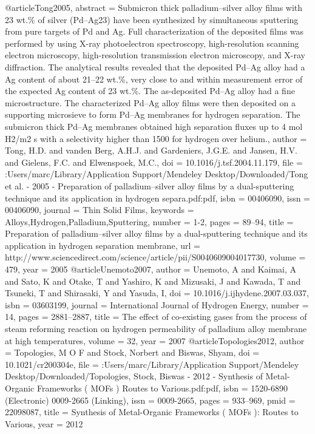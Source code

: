 @article{Tong2005,
abstract = {Submicron thick palladium–silver alloy films with 23 wt.{\%} of silver (Pd–Ag23) have been synthesized by simultaneous sputtering from pure targets of Pd and Ag. Full characterization of the deposited films was performed by using X-ray photoelectron spectroscopy, high-resolution scanning electron microscopy, high-resolution transmission electron microscopy, and X-ray diffraction. The analytical results revealed that the deposited Pd–Ag alloy had a Ag content of about 21–22 wt.{\%}, very close to and within measurement error of the expected Ag content of 23 wt.{\%}. The as-deposited Pd–Ag alloy had a fine microstructure. The characterized Pd–Ag alloy films were then deposited on a supporting microsieve to form Pd–Ag membranes for hydrogen separation. The submicron thick Pd–Ag membranes obtained high separation fluxes up to 4 mol H2/m2 s with a selectivity higher than 1500 for hydrogen over helium.},
author = {Tong, H.D. and vanden Berg, A.H.J. and Gardeniers, J.G.E. and Jansen, H.V. and Gielens, F.C. and Elwenspoek, M.C.},
doi = {10.1016/j.tsf.2004.11.179},
file = {:Users/marc/Library/Application Support/Mendeley Desktop/Downloaded/Tong et al. - 2005 - Preparation of palladium–silver alloy films by a dual-sputtering technique and its application in hydrogen separa.pdf:pdf},
isbn = {00406090},
issn = {00406090},
journal = {Thin Solid Films},
keywords = {Alloys,Hydrogen,Palladium,Sputtering},
number = {1-2},
pages = {89--94},
title = {{Preparation of palladium–silver alloy films by a dual-sputtering technique and its application in hydrogen separation membrane}},
url = {http://www.sciencedirect.com/science/article/pii/S0040609004017730},
volume = {479},
year = {2005}
}
@article{Unemoto2007,
author = {Unemoto, A and Kaimai, A and Sato, K and Otake, T and Yashiro, K and Mizusaki, J and Kawada, T and Tsuneki, T and Shirasaki, Y and Yasuda, I},
doi = {10.1016/j.ijhydene.2007.03.037},
isbn = {03603199},
journal = {International Journal of Hydrogen Energy},
number = {14},
pages = {2881--2887},
title = {{The effect of co-existing gases from the process of steam reforming reaction on hydrogen permeability of palladium alloy membrane at high temperatures}},
volume = {32},
year = {2007}
}
@article{Topologies2012,
author = {Topologies, M O F and Stock, Norbert and Biswas, Shyam},
doi = {10.1021/cr200304e},
file = {:Users/marc/Library/Application Support/Mendeley Desktop/Downloaded/Topologies, Stock, Biswas - 2012 - Synthesis of Metal-Organic Frameworks ( MOFs ) Routes to Various.pdf:pdf},
isbn = {1520-6890 (Electronic) 0009-2665 (Linking)},
issn = {0009-2665},
pages = {933--969},
pmid = {22098087},
title = {{Synthesis of Metal-Organic Frameworks ( MOFs ): Routes to Various}},
year = {2012}
}
